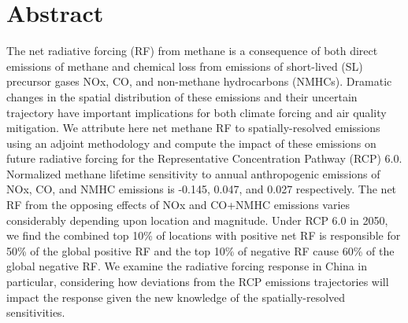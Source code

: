 \section*{Abstract}

The net radiative forcing (RF) from methane is a consequence of both direct emissions of methane and chemical loss from emissions of short-lived (SL) precursor gases NOx, CO, and non-methane hydrocarbons (NMHCs). Dramatic changes in the spatial distribution of these emissions and their uncertain trajectory have important implications for both climate forcing and air quality mitigation.  We attribute here net methane RF  to spatially-resolved emissions using an adjoint methodology and compute the impact of these emissions on future radiative forcing for the Representative Concentration Pathway (RCP) 6.0.  Normalized methane lifetime sensitivity  to annual anthropogenic emissions of NOx, CO, and NMHC emissions is -0.145, 0.047, and 0.027 respectively. The net RF from the opposing effects of NOx and CO+NMHC emissions varies considerably depending upon location and magnitude.  Under RCP 6.0 in 2050,  we find the combined top 10\% of locations with positive net RF is responsible for 50\% of the global positive RF and the top 10\% of negative RF  cause 60\% of the global negative RF. We examine the radiative forcing response in China in particular, considering how deviations from the RCP emissions trajectories will impact the response given the new knowledge of the spatially-resolved sensitivities.